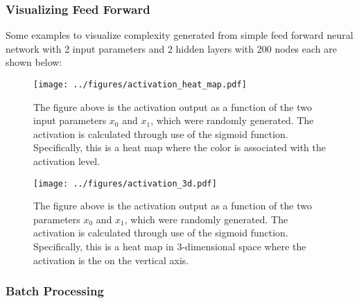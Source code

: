 \subsubsection{Visualizing Feed Forward}
Some examples to visualize complexity generated from simple feed forward neural network with 2 input parameters and 2 hidden layers with 200 nodes each are shown below:

\begin{figure}[H]
\centering
\texttt{[image: ../figures/activation\_heat\_map.pdf]}
\caption{The figure above is the activation output as a function of the two input parameters $x_0$ and $x_1$, which were randomly generated. The activation is calculated through use of the sigmoid function. Specifically, this is a heat map where the color is associated with the activation level.}
\end{figure}

\begin{figure}[H]
\centering
\texttt{[image: ../figures/activation\_3d.pdf]}
\caption{The figure above is the activation output as a function of the two parameters $x_0$ and $x_1$, which were randomly generated. The activation is calculated through use of the sigmoid function. Specifically, this is a heat map in 3-dimensional space where the activation is the on the vertical axis.}
\end{figure}

\subsubsection{Batch Processing}


